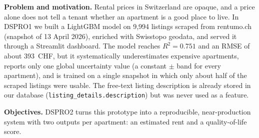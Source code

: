 \documentclass[11pt,a4paper]{article}
\begin{document}
\textbf{Problem and motivation.} Rental prices in Switzerland are opaque, and a price alone does not tell a tenant whether an apartment is a good place to live. In DSPRO1 we built a LightGBM model on 9{,}994 listings scraped from rentumo.ch (snapshot of 13 April 2026), enriched with Swisstopo geodata, and served it through a Streamlit dashboard. The model reaches $R^2 = 0.751$ and an RMSE of about 393~CHF, but it systematically underestimates expensive apartments, reports only one global uncertainty value (a constant $\pm$ band for every apartment), and is trained on a single snapshot in which only about half of the scraped listings were usable. The free-text listing description is already stored in our database (\texttt{listing\_details.description}) but was never used as a feature.

\textbf{Objectives.} DSPRO2 turns this prototype into a reproducible, near-production system with two outputs per apartment: an estimated rent and a quality-of-life score.
\end{document}
